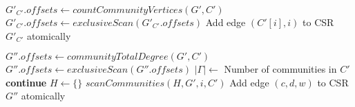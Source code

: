 \begin{algorithm}[hbtp]
\begin{algorithmic}[1]
\Statex

  \State $G'_{C'}.offsets \gets countCommunityVertices(G', C')$
  \State $G'_{C'}.offsets \gets exclusiveScan(G'_{C'}.offsets)$
    \State Add edge $(C'[i], i)$ to CSR $G'_{C'}$ atomically
  \EndFor
\EndFunction

  \State $G''.offsets \gets communityTotalDegree(G', C')$
  \State $G''.offsets \gets exclusiveScan(G''.offsets)$
  \State $|\Gamma| \gets$ Number of communities in $C'$
  \ForAll{$c \in [0, |\Gamma|)$ \textbf{in parallel}}
     \textbf{continue}
    \EndIf
    \State $H \gets \{\}$
      \State $scanCommunities(H, G', i, C')$
    \EndFor
      \State Add edge $(c, d, w)$ to CSR $G''$ atomically
    \EndFor
  \EndFor
\EndFunction
\end{algorithmic}
\end{algorithm}




